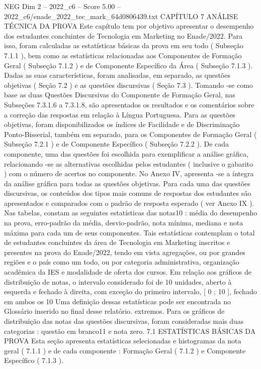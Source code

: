 \begin{textsample}{NEG Dim 2 – 2022\_c6 – Score 5.00 – 2022\_c6/enade\_2022\_tec\_mark\_64d0806439.txt}  \label{ex:f2_neg_301}
CAPÍTULO 7 ANÁLISE TÉCNICA DA PROVA Este capítulo tem por objetivo apresentar o desempenho dos estudantes concluintes de Tecnologia em Marketing no Enade/2022.
Para isso, foram calculadas as estatísticas básicas da prova em seu todo ( Subseção 7.1.1 ), bem como as estatísticas relacionadas aos Componentes de Formação Geral ( Subseção 7.1.2 ) e de Componente Específico da Área ( Subseção 7.1.3 ).
Dadas as suas características, foram analisadas, em separado, as questões objetivas ( Seção 7.2 ) e as questões discursivas ( Seção 7.3 ).
Tomando -se como base as duas Questões Discursivas do Componente de Formação Geral, nas Subseções 7.3.1.6 a 7.3.1.8, são apresentados os resultados e os comentários sobre a correção das respostas em relação à Língua Portuguesa.
Para as questões objetivas, foram disponibilizados os índices de Facilidade e de Discriminação Ponto-Bisserial, também em separado, para os Componentes de Formação Geral ( Subseção 7.2.1 ) e de Componente Específico ( Subseção 7.2.2 ).
De cada componente, uma das questões foi escolhida para exemplificar a análise gráfica, relacionando -se as alternativas escolhidas pelos estudantes ( inclusive o gabarito ) com o número de acertos no componente.
No Anexo IV, apresenta -se a íntegra da análise gráfica para todas as questões objetivas.
Para cada uma das questões discursivas, os conteúdos dos tipos mais comuns de respostas dos estudantes são apresentados e comparados com o padrão de resposta esperado ( ver Anexo IX ).
Nas tabelas, constam as seguintes estatísticas das notas10 : média do desempenho na prova, erro-padrão da média, desvio-padrão, nota mínima, mediana e nota máxima para cada um de seus componentes.
Tais estatísticas contemplam o total de estudantes concluintes da área de Tecnologia em Marketing inscritos e presentes na prova do Enade/2022, tendo em vista agregações, ou por grandes regiões e o país como um todo, ou por categoria administrativa, organização acadêmica da IES e modalidade de oferta dos cursos.
Em relação aos gráficos de distribuição de notas, o intervalo considerado foi de 10 unidades, aberto à esquerda e fechado à direita, com exceção do primeiro intervalo, [ 0 ; 10 ], fechado em ambos os 10 Uma definição dessas estatísticas pode ser encontrada no Glossário inserido no final desse relatório. extremos.
Para os gráficos de distribuição das notas das questões discursivas, foram consideradas mais duas categorias : questão em branco11 e nota zero. 7.1 ESTATÍSTICAS BÁSICAS DA PROVA Esta seção apresenta estatísticas selecionadas e histogramas da nota geral ( 7.1.1 ) e de cada componente : Formação Geral ( 7.1.2 ) e Componente Específico ( 7.1.3 ).

\end{textsample}

